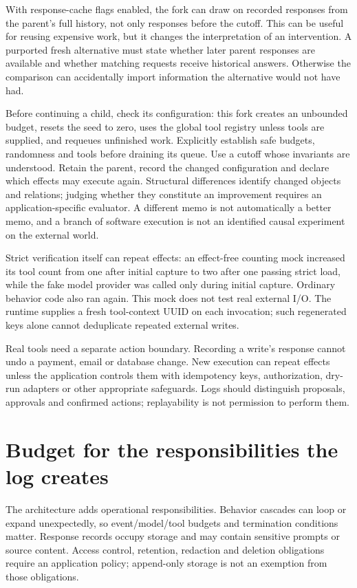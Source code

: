 \documentclass[11pt]{article}
\begin{document}
With response-cache flags enabled, the fork can draw on recorded responses from the parent's full history, not only responses before the cutoff. This can be useful for reusing expensive work, but it changes the interpretation of an intervention. A purported fresh alternative must state whether later parent responses are available and whether matching requests receive historical answers. Otherwise the comparison can accidentally import information the alternative would not have had.

Before continuing a child, check its configuration: this fork creates an unbounded budget, resets the seed to zero, uses the global tool registry unless tools are supplied, and requeues unfinished work. Explicitly establish safe budgets, randomness and tools before draining its queue. Use a cutoff whose invariants are understood. Retain the parent, record the changed configuration and declare which effects may execute again. Structural differences identify changed objects and relations; judging whether they constitute an improvement requires an application-specific evaluator. A different memo is not automatically a better memo, and a branch of software execution is not an identified causal experiment on the external world.

Strict verification itself can repeat effects: an effect-free counting mock increased its tool count from one after initial capture to two after one passing strict load, while the fake model provider was called only during initial capture. Ordinary behavior code also ran again. This mock does not test real external I/O. The runtime supplies a fresh tool-context UUID on each invocation; such regenerated keys alone cannot deduplicate repeated external writes.

Real tools need a separate action boundary. Recording a write's response cannot undo a payment, email or database change. New execution can repeat effects unless the application controls them with idempotency keys, authorization, dry-run adapters or other appropriate safeguards. Logs should distinguish proposals, approvals and confirmed actions; replayability is not permission to perform them.

\section*{Budget for the responsibilities the log creates}
The architecture adds operational responsibilities. Behavior cascades can loop or expand unexpectedly, so event/model/tool budgets and termination conditions matter. Response records occupy storage and may contain sensitive prompts or source content. Access control, retention, redaction and deletion obligations require an application policy; append-only storage is not an exemption from those obligations.
\end{document}
